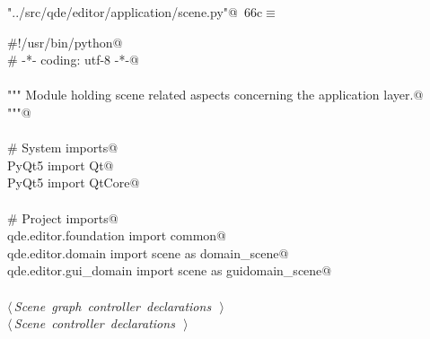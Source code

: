 \documentclass[
    a4paper,      %
    10pt,         %
    openright,    %
    notitlepage,  %
    parskip=half, %
]{scrreprt}       %
\theoremstyle{definition}                    %
\begin{document}
\begin{flushleft} \small
\begin{minipage}{\linewidth}\label{scrap114}\raggedright\small
{} \verb@"../src/qde/editor/application/scene.py"@\nobreak\ {\footnotesize {66c}}$\equiv$
\vspace{-1ex}
\begin{list}{}{} \item
\mbox{}\lstinline@#!/usr/bin/python@\\
\mbox{}\lstinline@# -*- coding: utf-8 -*-@\\
\mbox{}\lstinline@@\\
\mbox{}\lstinline@""" Module holding scene related aspects concerning the application layer.@\\
\mbox{}\lstinline@"""@\\
\mbox{}\lstinline@@\\
\mbox{}\lstinline@# System imports@\\
\mbox{}\lstinline@from PyQt5 import Qt@\\
\mbox{}\lstinline@from PyQt5 import QtCore@\\
\mbox{}\lstinline@@\\
\mbox{}\lstinline@# Project imports@\\
\mbox{}\lstinline@from qde.editor.foundation import common@\\
\mbox{}\lstinline@from qde.editor.domain     import scene as domain_scene@\\
\mbox{}\lstinline@from qde.editor.gui_domain import scene as guidomain_scene@\\
\mbox{}\lstinline@@\\
\mbox{}\lstinline@@\hbox{$\langle\,${\itshape Scene graph controller declarations}\nobreak\ {\footnotesize {}}$\,\rangle$}\lstinline@@\\
\mbox{}\lstinline@@\hbox{$\langle\,${\itshape Scene controller declarations}\nobreak\ {\footnotesize {}}$\,\rangle$}\lstinline@@\\
\mbox{}\lstinline@@{\NWsep}
\end{list}
\vspace{-1.5ex}
\footnotesize
\begin{list}{}{\setlength{\itemsep}{-\parsep}\setlength{\itemindent}{-\leftmargin}}

\item{}
\end{list}
\end{minipage}\vspace{4ex}
\end{flushleft}
\end{document}
